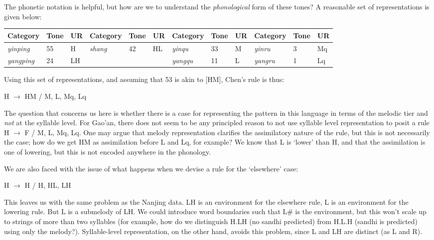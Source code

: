 \documentclass{article}
\begin{document}
The phonetic notation is helpful, but how are we to understand the \emph{phonological} form of these tones? A reasonable set of representations is given below:
\begin{exe}
\ex
\begin{tabular}[t]{lll|lll|lll|lll}
Category & Tone & UR & Category & Tone & UR & Category & Tone & UR & Category & Tone & UR \\
\hline
\textit{yinping} & 55 & H & \textit{shang} & 42 & HL & \textit{yinqu} & 33 & M & \textit{yinru} & 3 & Mq \\
\textit{yangping} & 24 & LH & & & &  \textit{yangqu} & 11 & L & \textit{yangru} & 1 & Lq \\
\end{tabular}
\end{exe}
Using this set of representations, and assuming that 53 is akin to [HM], Chen's rule is thus:
\begin{exe}
\ex
H $\rightarrow$ HM / \underline{\hspace{1em}} M, L, Mq, Lq
\end{exe}
The question that concerns us here is whether there is a case for representing the pattern in this language in terms of the melodic tier and \emph{not} at the syllable level. For Gao'an, there does not seem to be any principled reason to not use syllable level representation to posit a rule H $\rightarrow$ F / \underline{\hspace{1em}} M, L, Mq, Lq. One may argue that melody representation clarifies the assimilatory nature of the rule, but this is not necessarily the case; how do we get HM as assimilation before L and Lq, for example? We know that L is `lower' than H, and that the assimilation is one of lowering, but this is not encoded anywhere in the phonology.  \par
We are also faced with the issue of what happens when we devise a rule for the `elsewhere' case:
\begin{exe}
\ex
H $\rightarrow$ H / \underline{\hspace{1em}} H, HL, LH
\end{exe}
This leaves us with the same problem as the Nanjing data. LH is an environment for the elsewhere rule, L is an environment for the lowering rule. But L is a submelody of LH. We could introduce word boundaries such that L\# is the environment, but this won't scale up to strings of more than two syllables (for example, how do we distinguish H.LH (no sandhi predicted) from H.L.H (sandhi is predicted) using only the melody?). Syllable-level representation, on the other hand, avoids this problem, since L and LH are distinct (as L and R). \par
\end{document}
